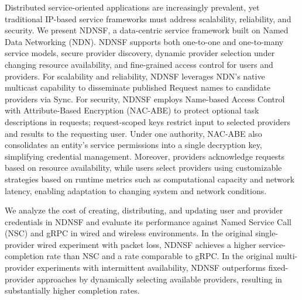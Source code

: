 Distributed service-oriented applications are increasingly prevalent, yet traditional IP-based service frameworks must address scalability, reliability, and security. We present NDNSF, a data-centric service framework built on Named Data Networking (NDN). NDNSF supports both one-to-one and one-to-many service models, secure provider discovery, dynamic provider selection under changing resource availability, and fine-grained access control for users and providers. For scalability and reliability, NDNSF leverages NDN’s native multicast capability to disseminate published Request names to candidate providers via Sync. For security, NDNSF employs Name-based Access Control with Attribute-Based Encryption (NAC-ABE) to protect optional task descriptions in requests; request-scoped keys restrict input to selected providers and results to the requesting user. Under one authority, NAC-ABE also consolidates an entity’s service permissions into a single decryption key, simplifying credential management. Moreover, providers acknowledge requests based on resource availability, while users select providers using customizable strategies based on runtime metrics such as computational capacity and network latency, enabling adaptation to changing system and network conditions.

We analyze the cost of creating, distributing, and updating user and provider credentials in NDNSF and evaluate its performance against Named Service Call (NSC) and gRPC in wired and wireless environments. In the original single-provider wired experiment with packet loss, NDNSF achieves a higher service-completion rate than NSC and a rate comparable to gRPC. In the original multi-provider experiments with intermittent availability, NDNSF outperforms fixed-provider approaches by dynamically selecting available providers, resulting in substantially higher completion rates.

